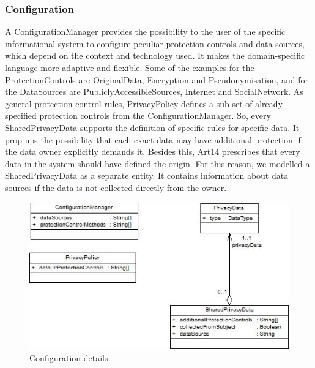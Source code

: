 \documentclass[11pt,english]{article}
\begin{document}
\subsubsection{Configuration}
A ConfigurationManager provides the possibility to the user of the specific informational system to configure peculiar protection controls and data sources, 
which depend on the context and technology used. It makes the domain-specific language more adaptive and flexible. Some of the examples for the ProtectionControls are OriginalData, Encryption and Pseudonymisation, and for the DataSources are PubliclyAccessibleSources, Internet and SocialNetwork. As general protection control rules, PrivacyPolicy defines a sub-set of already specified protection controls from the ConfigurationManager. So, every SharedPrivacyData supports the definition of specific rules for specific data. It prop-ups the possibility that each exact data may have additional protection if the data owner explicitly demands it. Besides this, Art14 prescribes that every data in the system should have defined the origin. For this reason, we modelled a SharedPrivacyData as a separate entity. It contains information about data sources if the data is not collected directly from the owner.
\begin{figure}[H]
    \centering
    \includegraphics[width=12.5cm]{images/configuration.jpg}
    \caption{Configuration details}
    \label{fig:configuration}
\end{figure}
\end{document}
